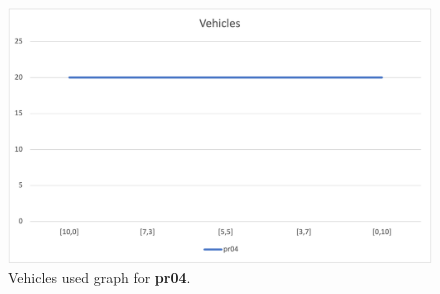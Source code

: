\begin{figure}[H]
    \centering
    \includegraphics[height=0.25\textheight]{../graphs/pr04-vehicles.png}
    \caption{Vehicles used graph for \textbf{pr04}.}
\end{figure}

\newpage